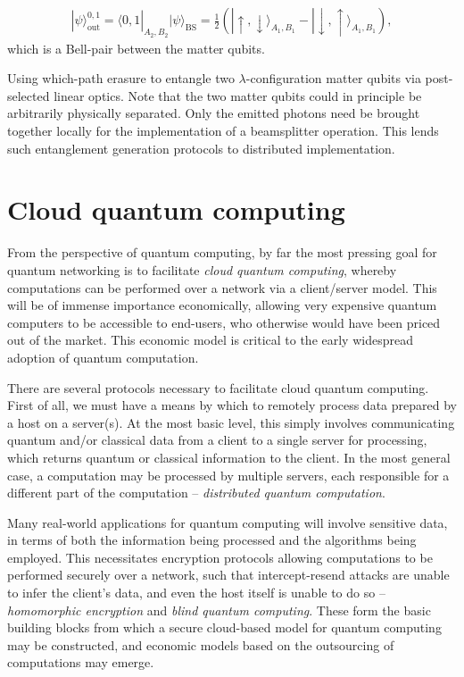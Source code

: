 \documentclass[aps,rmp,twocolumn,amsmath,amssymb,nofootinbib,superscriptaddress,longbibliography,floatfix,table-of-contents,eqsecnum]{revtex4-1}
\newcommand{\bra}[1]{\langle#1|}
\newcommand{\ket}[1]{|#1\rangle}
\begin{document}
\begin{table}[!htb]
{{{\begin{enumerate}
\begin{align}
\ket\psi_\text{out}^{0,1} = \bra{0,1}_{A_2,B_2} \ket\psi_\text{BS} = \frac{1}{2} (\ket{\!\uparrow,\downarrow}_{A_1,B_1} - \ket{\!\downarrow,\uparrow}_{A_1,B_1}),
\end{align}
which is a Bell-pair between the matter qubits.
\end{enumerate}}}}
\caption{Using which-path erasure to entangle two $\lambda$-configuration matter qubits via post-selected linear optics. Note that the two matter qubits could in principle be arbitrarily physically separated. Only the emitted photons need be brought together locally for the implementation of a beamsplitter operation. This lends such entanglement generation protocols to distributed implementation.} \label{alg:which_path}
\end{table}

%
%

\section{Cloud quantum computing} \label{sec:cloud} 

From the perspective of quantum computing, by far the most pressing goal for quantum networking is to facilitate \textit{cloud quantum computing}, whereby computations can be performed over a network via a client/server model. This will be of immense importance economically, allowing very expensive quantum computers to be accessible to end-users, who otherwise would have been priced out of the market. This economic model is critical to the early widespread adoption of quantum computation.

There are several protocols necessary to facilitate cloud quantum computing. First of all, we must have a means by which to remotely process data prepared by a host on a server(s). At the most basic level, this simply involves communicating quantum and/or classical data from a client to a single server for processing, which returns quantum or classical information to the client. In the most general case, a computation may be processed by multiple servers, each responsible for a different part of the computation -- \textit{distributed quantum computation}.

Many real-world applications for quantum computing will involve sensitive data, in terms of both the information being processed and the algorithms being employed. This necessitates encryption protocols allowing computations to be performed securely over a network, such that intercept-resend attacks are unable to infer the client's data, and even the host itself is unable to do so -- \textit{homomorphic encryption} and \textit{blind quantum computing}. These form the basic building blocks from which a secure cloud-based model for quantum computing may be constructed, and economic models based on the outsourcing of computations may emerge.
\end{document}
